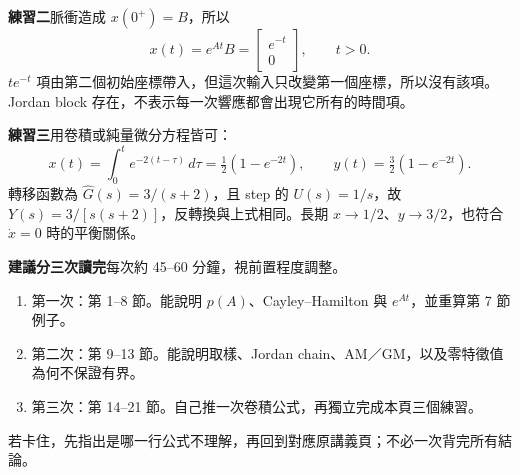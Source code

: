 \documentclass[12pt,a4paper]{article}
\begin{document}
\textbf{練習二}\quad 脈衝造成 $x(0^+)=B$，所以
\[
 x(t)=e^{At}B=\begin{bmatrix}e^{-t}\\0\end{bmatrix},\qquad t>0.
\]
$te^{-t}$ 項由第二個初始座標帶入，但這次輸入只改變第一個座標，所以沒有該項。Jordan block 存在，不表示每一次響應都會出現它所有的時間項。

\textbf{練習三}\quad 用卷積或純量微分方程皆可：
\[
 x(t)=\int_0^t e^{-2(t-\tau)}\,d\tau=\tfrac12(1-e^{-2t}),
 \qquad y(t)=\tfrac32(1-e^{-2t}).
\]
轉移函數為 $\widehat G(s)=3/(s+2)$，且 step 的 $U(s)=1/s$，故 $Y(s)=3/[s(s+2)]$，反轉換與上式相同。長期 $x\to1/2$、$y\to3/2$，也符合 $\dot x=0$ 時的平衡關係。

\textbf{建議分三次讀完}\quad 每次約 45--60 分鐘，視前置程度調整。
\begin{enumerate}
\item 第一次：第 1--8 節。能說明 $p(A)$、Cayley--Hamilton 與 $e^{At}$，並重算第 7 節例子。
\item 第二次：第 9--13 節。能說明取樣、Jordan chain、AM／GM，以及零特徵值為何不保證有界。
\item 第三次：第 14--21 節。自己推一次卷積公式，再獨立完成本頁三個練習。
\end{enumerate}
若卡住，先指出是哪一行公式不理解，再回到對應原講義頁；不必一次背完所有結論。
\end{document}
